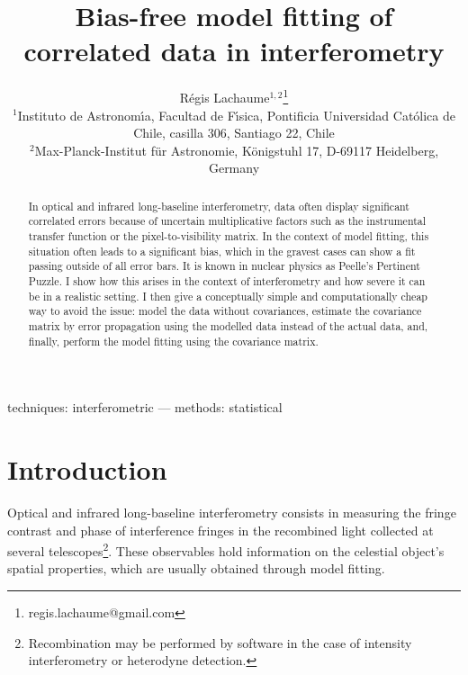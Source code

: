 \documentclass[a4paper,fleqn,usenatbib]{mnras}
\begin{document}
\title{Bias-free model fitting of correlated data in interferometry}
\author[Lachaume]{R\'egis Lachaume$^{1,2}$\thanks{regis.lachaume@gmail.com}
\\
$^{1}$Instituto de Astronom\'\i{}a, Facultad de F\'\i{}sica, Pontificia Universidad Cat\'olica de Chile, casilla 306, Santiago 22, Chile\\
$^{2}$Max-Planck-Institut f\"ur Astronomie, K\"onigstuhl 17, D-69117 Heidelberg, Germany
}
\maketitle

\begin{abstract}
In optical and infrared long-baseline interferometry, data often display significant correlated errors because of uncertain multiplicative factors such as the instrumental transfer function or the pixel-to-visibility matrix.  In the context of model fitting, this situation often leads to a significant bias, which in the gravest cases can show a fit passing outside of all error bars. It is known in nuclear physics as Peelle's Pertinent Puzzle.  I show how this arises in the context of interferometry and how severe it can be in a realistic setting.  I then give a conceptually simple and computationally cheap way to avoid the issue: model the data without covariances, estimate the covariance matrix by error propagation using the modelled data instead of the actual data, and, finally, perform the model fitting using the covariance matrix.
\end{abstract}

\begin{keywords}
techniques: interferometric --- 
methods: statistical
\end{keywords}

\section{Introduction}

Optical and infrared long-baseline interferometry consists in measuring the fringe contrast and phase of interference fringes in the recombined light collected at several telescopes\footnote{Recombination may be performed by software in the case of intensity interferometry or heterodyne detection.}. These observables hold information on the celestial object's spatial properties, which are usually obtained through model fitting. 
\end{document}
